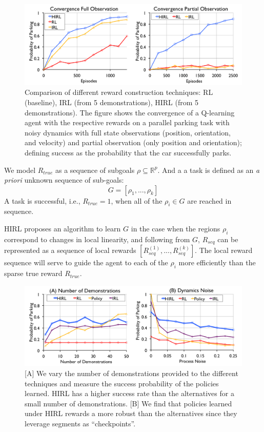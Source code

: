 \documentclass[letterpaper, 10 pt, conference]{ieeeconf}
\newcommand{\hirl}{HIRL\xspace}
\begin{document}
\begin{figure}[t]
\centering
 \includegraphics[width=\columnwidth]{figures/rc-teaser.png}
 \caption{ Comparison of different reward construction techniques: RL (baseline), IRL (from 5 demonstrations), HIRL (from 5 demonstrations).
 The figure shows the convergence of a Q-learning agent with the respective rewards on a parallel parking task with noisy dynamics with full state observations (position, orientation, and velocity) and partial observation (only position and orientation); defining success as the probability that the car successfully parks.
 \label{exp:rcsegmentation-res}}
\end{figure}

We model $R_{true}$ as a sequence of subgoals $\rho \subseteq \mathbb{R}^p$.
And a a task is defined as an \emph{a priori} unknown sequence of sub-goals:
\[
G = [\rho_1,...,\rho_k]
\]
A task is successful, i.e., $R_{true}=1$, when all of the $\rho_i \in G$ are reached in sequence.

\hirl proposes an algorithm to learn $G$ in the case when the regions $\rho_i$ correspond to changes in local linearity, and following from $G$, $R_{seq}$ can be represented as a sequence of local rewards $[R^{(1)}_{seq},...,R^{(k)}_{seq}]$. 
The local reward sequence will serve to guide the agent to each of the $\rho_i$ more efficiently than the sparse true reward $R_{true}$.

\begin{figure}[t]
\centering
 \includegraphics[width=\columnwidth]{exp/rc-car-segmentation-2ab.png}
 \caption{ [A] We vary the number of demonstrations provided to the different techniques and measure the success probability of the policies learned. \hirl has a higher success rate than the alternatives for a small number of demonstrations. [B] We find that policies learned under \hirl rewards a more robust than the alternatives since they leverage segments as ``checkpoints''.  \label{exp:rcsegmentation-res2}}
\end{figure}
\end{document}

